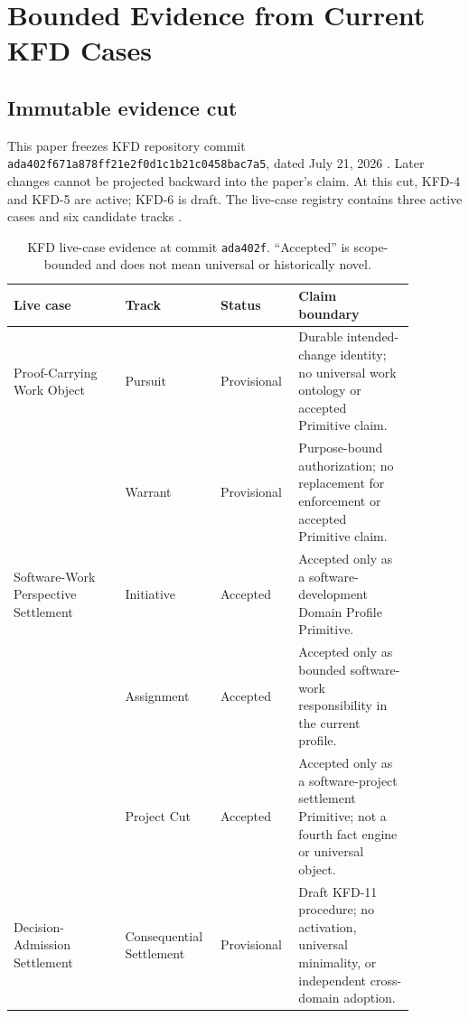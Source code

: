 \section{Bounded Evidence from Current KFD Cases}
\label{sec:evidence}

\subsection{Immutable evidence cut}

This paper freezes KFD repository commit
\texttt{ada402f671a878ff21e2f0d1c1b21c0458bac7a5}, dated July 21, 2026
\cite{kfdCut2026}. Later changes cannot be projected backward into the paper's
claim. At this cut, KFD-4 and KFD-5 are active; KFD-6 is draft. The live-case
registry contains three active cases and six candidate tracks
\cite{kfdCases2026}.

\begin{table}[ht]
\centering
\small
\begin{tabular}{p{0.265\linewidth}p{0.195\linewidth}p{0.145\linewidth}p{0.275\linewidth}}
\toprule
Live case & Track & Status & Claim boundary \\
\midrule
Proof-Carrying Work Object & Pursuit & Provisional & Durable intended-change
identity; no universal work ontology or accepted Primitive claim. \\
 & Warrant & Provisional & Purpose-bound authorization; no replacement for
enforcement or accepted Primitive claim. \\
\addlinespace
Software-Work Perspective Settlement & Initiative & Accepted & Accepted only
as a software-development Domain Profile Primitive. \\
 & Assignment & Accepted & Accepted only as bounded software-work
responsibility in the current profile. \\
 & Project Cut & Accepted & Accepted only as a software-project settlement
Primitive; not a fourth fact engine or universal object. \\
\addlinespace
Decision-Admission Settlement & Consequential Settlement & Provisional & Draft
KFD-11 procedure; no activation, universal minimality, or independent
cross-domain adoption. \\
\bottomrule
\end{tabular}
\caption{KFD live-case evidence at commit \texttt{ada402f}. ``Accepted'' is
scope-bounded and does not mean universal or historically novel.}
\label{tab:cases}
\end{table}

